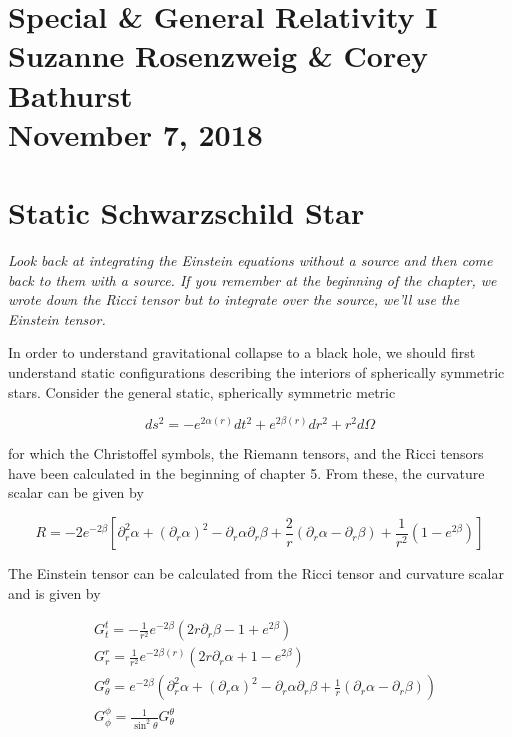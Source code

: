 \documentclass[12pt]{extarticle}
\begin{document}
\section*{\centering Special \& General Relativity I \\ \small Suzanne Rosenzweig \& Corey Bathurst \\ \small November 7, 2018}

\section{Static Schwarzschild Star}

\textit{Look back at integrating the Einstein equations without a source and then come back to them with a source. If you remember at the beginning of the chapter, we wrote down the Ricci tensor but to integrate over the source, we'll use the Einstein tensor.}

In order to understand gravitational collapse to a black hole, we should first understand static configurations describing the interiors of spherically symmetric stars. Consider the general static, spherically symmetric metric

\begin{equation}
ds^2 = -e^{2\alpha(r)}dt^2 + e^{2\beta(r)}dr^2 + r^2d\Omega
\end{equation}

for which the Christoffel symbols, the Riemann tensors, and the Ricci tensors have been calculated in the beginning of chapter 5. From these, the curvature scalar can be given by

\begin{equation}
R = -2e^{-2\beta}\left[\partial_r^2\alpha+(\partial_r\alpha)^2-\partial_r\alpha\partial_r\beta+\frac{2}{r}(\partial_r\alpha-\partial_r\beta)+\frac{1}{r^2}(1-e^{2\beta})\right]
\end{equation}

The Einstein tensor can be calculated from the Ricci tensor and curvature scalar and is given by

\begin{subequations}
\begin{align}\label{eintensa}
& G^t_t = -\frac{1}{r^2} e^{-2\beta} \left(2r\partial_r\beta - 1 +e^{2\beta} \right) \\ \label{eintensb}
& G^r_r = \frac{1}{r^2} e^{-2\beta(r)} \left(2r\partial_r\alpha + 1 - e^{2\beta}\right) \\
& G^\theta_\theta = e^{-2\beta} \left( \partial_r^2\alpha+(\partial_r\alpha)^2-\partial_r\alpha\partial_r\beta + \frac{1}{r}(\partial_r\alpha-\partial_r\beta)\right) \\
& G^\phi_\phi = \frac{1}{\sin^2\theta}G^\theta_\theta
\end{align}
\end{subequations}
\end{document}
